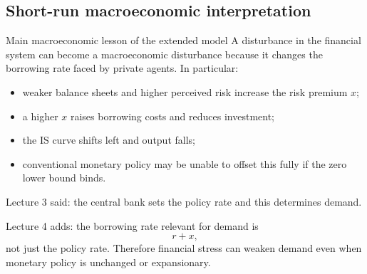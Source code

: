 \subsection{Short-run macroeconomic interpretation}

\begin{theorem}{Main macroeconomic lesson of the extended model}{}
A disturbance in the financial system can become a macroeconomic disturbance because it changes the borrowing rate faced by private agents. In particular:
\begin{itemize}[leftmargin=1.5em]
    \item weaker balance sheets and higher perceived risk increase the risk premium $x$;
    \item a higher $x$ raises borrowing costs and reduces investment;
    \item the IS curve shifts left and output falls;
    \item conventional monetary policy may be unable to offset this fully if the zero lower bound binds.
\end{itemize}
\end{theorem}

\begin{examtip}[title={Exam Focus: What Lecture 4 adds to Lecture 3}]
Lecture 3 said: the central bank sets the policy rate and this determines demand.  

Lecture 4 adds: the borrowing rate relevant for demand is
\[
r+x,
\]
not just the policy rate. Therefore financial stress can weaken demand even when monetary policy is unchanged or expansionary.
\end{examtip}